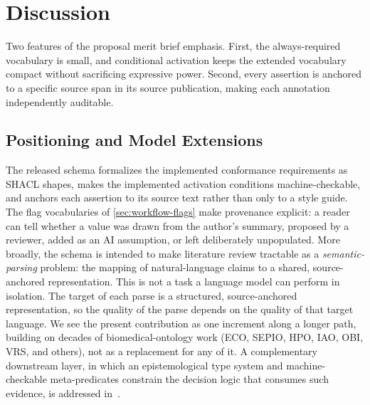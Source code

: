 %

\section{Discussion}
\label{sec:discussion}

Two features of the proposal merit brief emphasis. First, the
always-required vocabulary is small, and conditional activation keeps
the extended vocabulary compact without sacrificing expressive power.
Second, every assertion is anchored to a specific source span in its
source publication, making each annotation independently auditable.

\subsection{Positioning and Model Extensions}
\label{sec:disc-positioning}
\label{sec:disc-extensions}

The released schema formalizes the implemented conformance
requirements as SHACL shapes, makes the implemented activation
conditions machine-checkable, and anchors each assertion to its
source text rather than only to a style guide. The flag vocabularies
of \cref{sec:workflow-flags} make provenance explicit: a reader can
tell whether a value was drawn from the author's summary, proposed
by a reviewer, added as an AI assumption, or left deliberately
unpopulated. More broadly, the schema is intended to make literature review tractable as
a \emph{semantic-parsing} problem: the mapping of natural-language claims
to a shared, source-anchored representation. This is not a task a language model can perform in isolation. The target of
each parse is a structured, source-anchored representation, so the quality
of the parse depends on the quality of that target language. We see the present
contribution as one increment along a longer path, building on
decades of biomedical-ontology work (ECO, SEPIO, HPO, IAO, OBI, VRS,
and others), not as a replacement for any of it. A complementary
downstream layer, in which an epistemological type system and
machine-checkable meta-predicates constrain the decision logic that
consumes such evidence, is addressed in~\cite{our_preprint}.

